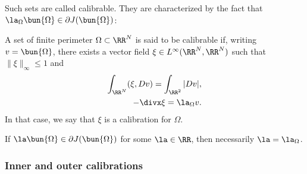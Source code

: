 Such sets are called calibrable. They are characterized by the fact that $\la_\Omega\bun{\Omega}\in \partial J(\bun{\Omega})$:

\begin{defn}
  A set of finite perimeter $\Omega\subset \RR^N$ is said to be calibrable if, writing $v=\bun{\Omega}$, there exists a vector field $\xi\in L^{\infty}(\RR^N,\RR^N)$ such that $\|\xi\|_\infty \leq 1$
  and 
  \begin{align}
    \int_{\RR^N} (\xi, Dv)=\int_{\RR^2} |Dv|,\\
    -\divx \xi =\la_\Omega v.
  \end{align}
  In that case, we say that $\xi$ is a calibration for $\Omega$.
\end{defn}

\begin{rem} If $\la \bun{\Omega}\in \partial J(\bun{\Omega})$ for some $\la\in \RR$, then necessarily $\la=\la_\Omega$.
\end{rem}


\subsubsection{Inner and outer calibrations}

